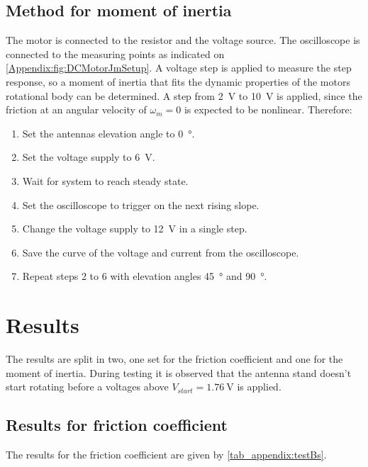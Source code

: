 \subsection*{Method for moment of inertia}
The motor is connected to the resistor and the voltage source. The oscilloscope is connected to the measuring points as indicated on \autoref{Appendix:fig:DCMotorJmSetup}. A voltage step is applied to measure the step response, so a moment of inertia that fits the dynamic properties of the motors rotational body can be determined. A step from \SI{2}{\volt} to \SI{10}{\volt} is applied, since the friction at an angular velocity of $\omega_m = 0$ is expected to be nonlinear. Therefore:
\begin{enumerate}
\item Set the antennas elevation angle to \SI{0}{\degree}.
\item Set the voltage supply to \SI{6}{\volt}.
\item Wait for system to reach steady state.
\item Set the oscilloscope to trigger on the next rising slope.
\item Change the voltage supply to \SI{12}{\volt} in a single step.
\item Save the curve of the voltage and current from the oscilloscope.
\item Repeat steps 2 to 6 with elevation angles \SI{45}{\degree} and \SI{90}{\degree}.
\end{enumerate}

\section*{Results}
The results are split in two, one set for the friction coefficient and one for the moment of inertia.
During testing it is observed that the antenna stand doesn't start rotating before a voltages above $V_{start} = \SI{1.76}{\volt}$ is applied.
\subsection*{Results for friction coefficient}
The results for the friction coefficient are given by \autoref{tab_appendix:testBs}.

